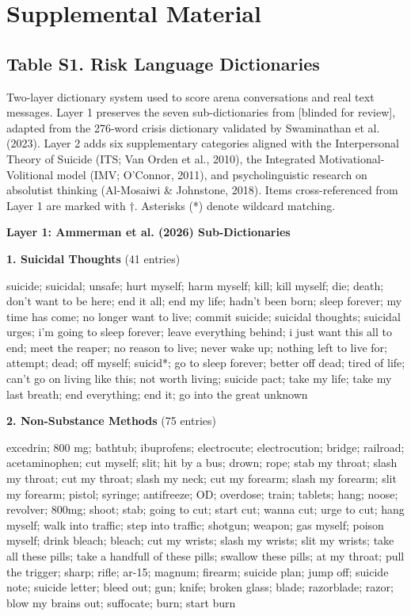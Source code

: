 \documentclass[review,12pt,authoryear]{elsarticle}
\begin{document}
\section*{Supplemental Material}

\subsection*{Table S1. Risk Language Dictionaries}

Two-layer dictionary system used to score arena conversations and real text messages. Layer 1 preserves the seven sub-dictionaries from [blinded for review], adapted from the 276-word crisis dictionary validated by Swaminathan et al. (2023). Layer 2 adds six supplementary categories aligned with the Interpersonal Theory of Suicide (ITS; Van Orden et al., 2010), the Integrated Motivational-Volitional model (IMV; O'Connor, 2011), and psycholinguistic research on absolutist thinking (Al-Mosaiwi \& Johnstone, 2018). Items cross-referenced from Layer 1 are marked with $\dagger$. Asterisks (*) denote wildcard matching.

\bigskip
\begin{center}\large\textbf{Layer 1: Ammerman et al. (2026) Sub-Dictionaries}\end{center}
\medskip

\noindent\textbf{1. Suicidal Thoughts} (41 entries)

\noindent\small suicide; suicidal; unsafe; hurt myself; harm myself; kill; kill myself; die; death; don't want to be here; end it all; end my life; hadn't been born; sleep forever; my time has come; no longer want to live; commit suicide; suicidal thoughts; suicidal urges; i'm going to sleep forever; leave everything behind; i just want this all to end; meet the reaper; no reason to live; never wake up; nothing left to live for; attempt; dead; off myself; suicid*; go to sleep forever; better off dead; tired of life; can't go on living like this; not worth living; suicide pact; take my life; take my last breath; end everything; end it; go into the great unknown

\bigskip

\noindent\normalsize\textbf{2. Non-Substance Methods} (75 entries)

\noindent\small excedrin; 800 mg; bathtub; ibuprofens; electrocute; electrocution; bridge; railroad; acetaminophen; cut myself; slit; hit by a bus; drown; rope; stab my throat; slash my throat; cut my throat; slash my neck; cut my forearm; slash my forearm; slit my forearm; pistol; syringe; antifreeze; OD; overdose; train; tablets; hang; noose; revolver; 800mg; shoot; stab; going to cut; start cut; wanna cut; urge to cut; hang myself; walk into traffic; step into traffic; shotgun; weapon; gas myself; poison myself; drink bleach; bleach; cut my wrists; slash my wrists; slit my wrists; take all these pills; take a handfull of these pills; swallow these pills; at my throat; pull the trigger; sharp; rifle; ar-15; magnum; firearm; suicide plan; jump off; suicide note; suicide letter; bleed out; gun; knife; broken glass; blade; razorblade; razor; blow my brains out; suffocate; burn; start burn
\end{document}
